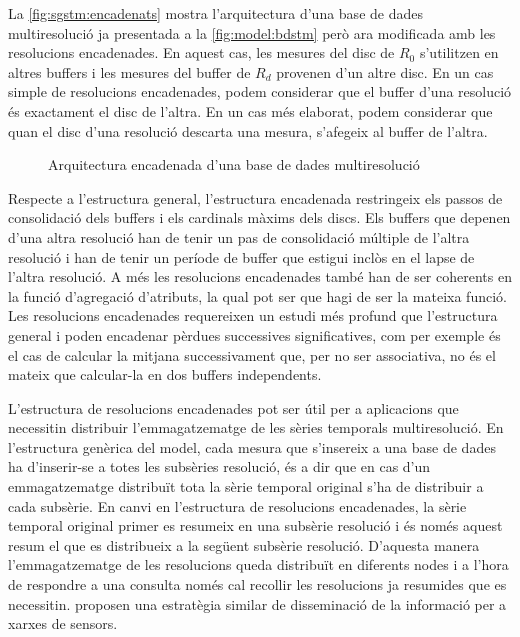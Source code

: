 La \autoref{fig:sgstm:encadenats} mostra l'arquitectura d'una base de
dades multiresolució ja presentada a la \autoref{fig:model:bdstm} però
ara modificada amb les resolucions encadenades.  En aquest cas, les
mesures del disc de $R_0$ s'utilitzen en altres buffers i les mesures
del buffer de $R_d$ provenen d'un altre disc. En un cas simple de
resolucions encadenades, podem considerar que el buffer d'una
resolució és exactament el disc de l'altra. En un cas més elaborat,
podem considerar que quan el disc d'una resolució descarta una mesura,
s'afegeix al buffer de l'altra.


\begin{figure}[tp]
  \centering
  
  \caption{Arquitectura encadenada d'una base de dades multiresolució}
  \label{fig:sgstm:encadenats}
\end{figure}


Respecte a l'estructura general, l'estructura encadenada restringeix
els passos de consolidació dels buffers i els cardinals màxims dels
discs. Els buffers que depenen d'una altra resolució han de tenir un
pas de consolidació múltiple de l'altra resolució i han de tenir un
període de buffer que estigui inclòs en el lapse de l'altra resolució.
A més les resolucions encadenades també han de ser coherents en la
funció d'agregació d'atributs, la qual pot ser que hagi de ser la
mateixa funció. Les resolucions encadenades requereixen un estudi més
profund que l'estructura general i poden encadenar pèrdues successives
significatives, com per exemple és el cas de calcular la mitjana
successivament que, per no ser associativa, no és el mateix que
calcular-la en dos buffers independents.


L'estructura de resolucions encadenades pot ser útil per a aplicacions
que necessitin distribuir l'emmagatzematge de les sèries temporals
multiresolució.  En l'estructura genèrica del model, cada mesura que
s'insereix a una base de dades ha d'inserir-se a totes les subsèries
resolució, és a dir que en cas d'un emmagatzematge distribuït tota la
sèrie temporal original s'ha de distribuir a cada subsèrie.  En canvi
en l'estructura de resolucions encadenades, la sèrie temporal original
primer es resumeix en una subsèrie resolució i és només aquest resum
el que es distribueix a la següent subsèrie resolució.  D'aquesta
manera l'emmagatzematge de les resolucions queda distribuït en
diferents nodes i a l'hora de respondre a una consulta només cal
recollir les resolucions ja resumides que es necessitin.
\textcite{deligiannakis07} proposen una estratègia similar de
disseminació de la informació per a xarxes de sensors.



